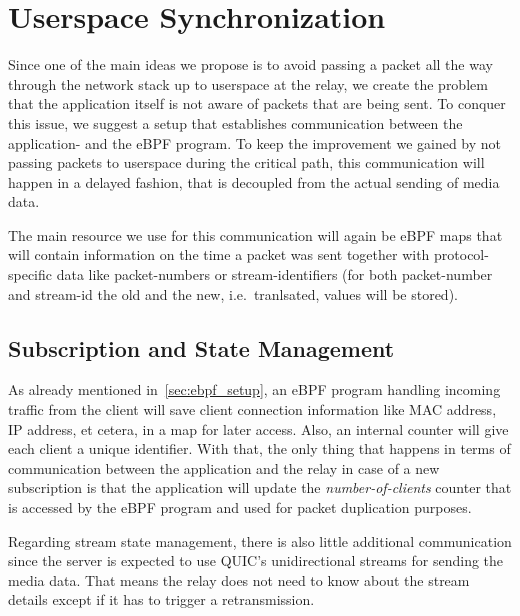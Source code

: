 \section{Userspace Synchronization}\label{sec:userspace_synchronization}

Since one of the main ideas we propose is to avoid passing a packet all the way
through the network stack up to userspace at the relay, we create the problem
that the application itself is not aware of packets that are being sent.
To conquer this issue, we suggest a setup that establishes communication
between the application- and the eBPF program.
To keep the improvement we gained by not passing packets to userspace during the 
critical path, this communication will happen in a delayed fashion, that is 
decoupled from the actual sending of media data.

The main resource we use for this communication will again be eBPF maps that
will contain information on the time a packet was sent together with protocol-specific 
data like packet-numbers or stream-identifiers (for both packet-number 
and stream-id the old and the new, i.e.~tranlsated, values will be stored).



\subsection{Subscription and State Management}
As already mentioned in~\autoref{sec:ebpf_setup}, an eBPF program handling incoming
traffic from the client will save client connection information like MAC address, IP 
address, et cetera, in a map for later access.
Also, an internal counter will give each client a unique identifier. %
With that, the only thing that happens in terms of communication between the application 
and the relay in case of a new subscription is that the application will update the 
\textit{number-of-clients} counter that is accessed by the eBPF program and used for packet duplication purposes.

Regarding stream state management, there is also little additional communication since the 
server is expected to use QUIC's unidirectional streams for sending the media data. 
That means the relay does not need to know about the stream details except if it 
has to trigger a retransmission.

